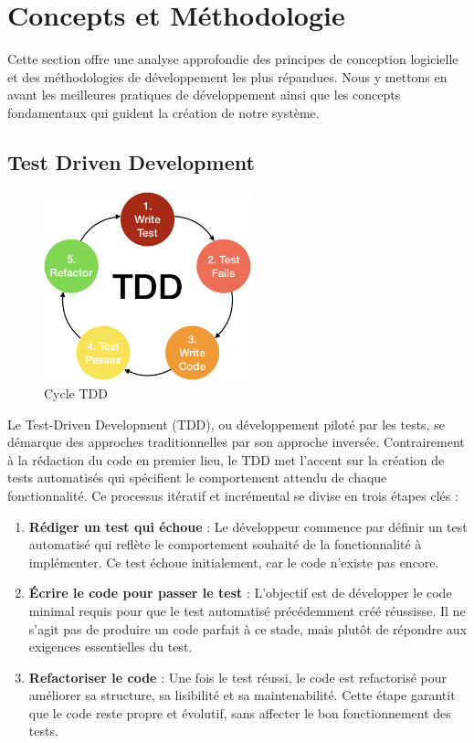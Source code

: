 \section{Concepts et Méthodologie}

Cette section offre une analyse approfondie des principes de conception logicielle et des méthodologies de développement les plus répandues. Nous y mettons en avant les meilleures pratiques de développement ainsi que les concepts fondamentaux qui guident la création de notre système.

\subsection{Test Driven Development}


\begin{figure}[H] 
    \centering
    \includegraphics[width=6cm]{Figures/TDD.png}
        \caption{Cycle TDD}
\end{figure}



Le Test-Driven Development (TDD), ou développement piloté par les tests, se démarque des approches traditionnelles par son approche inversée. Contrairement à la rédaction du code en premier lieu, le TDD met l'accent sur la création de tests automatisés qui spécifient le comportement attendu de chaque fonctionnalité. Ce processus itératif et incrémental se divise en trois étapes clés : 
\begin{enumerate} 

    \item \textbf{Rédiger un test qui échoue} : Le développeur commence par définir un test automatisé qui reflète le comportement souhaité de la fonctionnalité à implémenter. Ce test échoue initialement, car le code n'existe pas encore.

    \item \textbf{Écrire le code pour passer le test} : L'objectif est de développer le code minimal requis pour que le test automatisé précédemment créé réussisse. Il ne s'agit pas de produire un code parfait à ce stade, mais plutôt de répondre aux exigences essentielles du test.

    \item \textbf{Refactoriser le code} : Une fois le test réussi, le code est refactorisé pour améliorer sa structure, sa lisibilité et sa maintenabilité. Cette étape garantit que le code reste propre et évolutif, sans affecter le bon fonctionnement des tests.
\end{enumerate}

